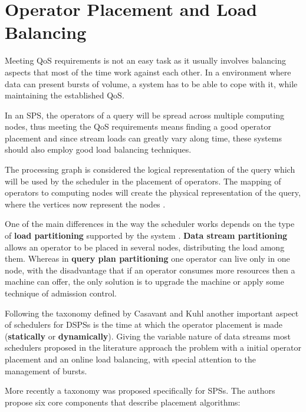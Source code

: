 \documentclass[ppgc,diss,english]{iiufrgs}
\begin{document}
\section{Operator Placement and Load Balancing}
\label{sec:esp:scheduling_load_balancing}

Meeting QoS requirements is not an easy task as it usually involves balancing aspects that most of the time work against each other. In a environment where data can present bursts of volume, a system has to be able to cope with it, while maintaining the established QoS.

In an SPS, the operators of a query will be spread across multiple computing nodes, thus meeting the QoS requirements means finding a good operator placement and since stream loads can greatly vary along time, these systems should also employ good load balancing techniques.


The processing graph is considered the logical representation of the query which will be used by the scheduler in the placement of operators. The mapping of operators to computing nodes will create the physical representation of the query, where the vertices now represent the nodes \cite{kossmann2000state, lei2012robust}.

One of the main differences in the way the scheduler works depends on the type of \textbf{load partitioning} supported by the system \cite{johnson2008query}. \textbf{Data stream partitioning} allows an operator to be placed in several nodes, distributing the load among them. Whereas in \textbf{query plan partitioning} one operator can live only in one node, with the disadvantage that if an operator consumes more resources then a machine can offer, the only solution is to upgrade the machine or apply some technique of admission control.

Following the taxonomy defined by Casavant and Kuhl \cite{casavant1988taxonomy} another important aspect of schedulers for DSPSs is the time at which the operator placement is made (\textbf{statically} or \textbf{dynamically}). Giving the variable nature of data streams most schedulers proposed in the literature approach the problem with a initial operator placement and an online load balancing, with special attention to the management of bursts.

More recently a taxonomy was proposed \cite{lakshmanan2008placement} specifically for SPSs. The authors propose six core components that describe placement algorithms:
\end{document}
